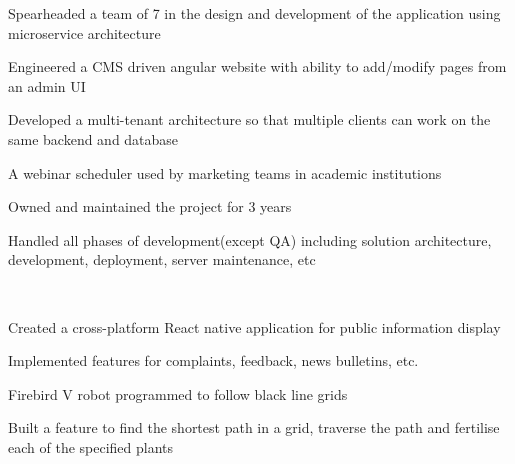 \documentclass[]{deedy-resume-openfont}
\begin{document}
\begin{minipage}[t]{0.66\textwidth}
\begin{tightemize}
    \item Spearheaded a team of 7 in the design and development of the application using microservice architecture
    \item Engineered a CMS driven angular website with ability to add/modify pages from an admin UI
    \item Developed a multi-tenant architecture so that multiple clients can work on the same backend and database
\end{tightemize}
\sectionsep

\begin{tightemize}
    \item A webinar scheduler used by marketing teams in academic institutions
    \item Owned and maintained the project for 3 years
    \item Handled all phases of development(except QA) including solution architecture, development, deployment, server maintenance, etc
\end{tightemize}
\sectionsep

\\
\begin{tightemize}
    \item Created a cross-platform React native application for public information display
    \item Implemented features for complaints, feedback, news bulletins, etc.
\end{tightemize}
\sectionsep

\begin{tightemize}
    \item Firebird V robot programmed to follow black line grids
    \item Built a feature to find the shortest path in a grid, traverse the path and fertilise each of the specified plants
\end{tightemize}
\sectionsep



\end{minipage}
\end{document}
